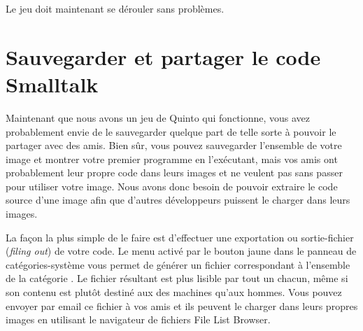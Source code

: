 \documentclass[a4paper,10pt,twoside]{book}
\begin{document}

Le jeu doit maintenant se dérouler sans problèmes.


\section{Sauvegarder et partager le code Smalltalk}
\label{sec:Monticello}

Maintenant que nous avons un jeu de Quinto qui fonctionne, vous avez
probablement envie de le sauvegarder quelque part de telle sorte à
pouvoir le partager avec des amis. Bien s\^ur, vous pouvez sauvegarder
l'ensemble de votre image \sq et montrer votre premier programme
en l'exécutant, mais vos amis ont probablement leur propre code dans
leurs images et ne veulent pas sans passer pour utiliser votre image.
Nous avons donc besoin de pouvoir extraire le code source d'une image
\sq afin que d'autres développeurs puissent le charger dans leurs images.

La façon la plus simple de le faire est d'effectuer une exportation ou
sortie-fichier (\emph{filing out}) de votre code. Le menu activé par
le bouton jaune dans le panneau de catégories-syst\`eme vous permet de
générer un fichier correspondant à l'ensemble de la catégorie .
Le fichier résultant est plus lisible par tout un chacun, même si son
contenu est plut\^ot destiné aux des machines qu'aux hommes.
Vous pouvez envoyer par email ce fichier à vos amis et ils peuvent le
charger dans leurs propres images \sq en utilisant le navigateur
de fichiers File List Browser.
\end{document}
